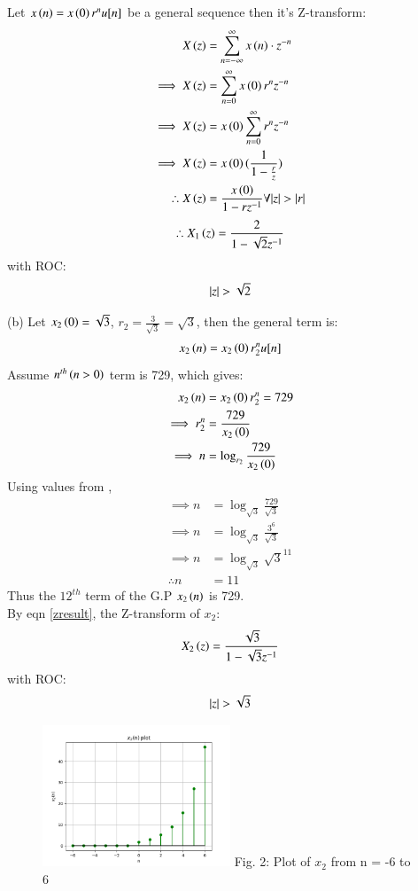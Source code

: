 \documentclass[journal,12pt,twocolumn]{IEEEtran}
\theoremstyle{remark}
\begin{document}
Let $x\left(n\right) = x\left(0\right)r^nu[n]$ be a general sequence then it's Z-transform:
\begin{align}
    X\left(z\right) &= \sum_{n = -\infty}^{\infty}{x\left(n\right) \cdot z^{-n}}\\
    \implies X\left(z\right) &= \sum_{n = 0}^{\infty}{x\left(0\right)r^{n}z^{-n}}\\
    \implies X\left(z\right) &= x\left(0\right)\sum_{n = 0}^{\infty}{r^n z^{-n}}\\
    \implies X\left(z\right) &= x\left(0\right)(\frac{1}{1 - \frac{r}{z}})\\
	\therefore X\left(z\right) &= \frac{x\left(0\right)}{1 - rz^{-1}} \forall {\left\vert z\right\vert > \left\vert r\right\vert} \label{zresult}
\end{align}
\begin{align}
    \therefore X_1\left(z\right) = \frac{2}{1 - \sqrt{2}z^{-1}}
\end{align}
with ROC: \[ \left\vert z\right\vert > \sqrt{2} \]

(b) Let $x_2\left(0\right) = \sqrt{3}$, $r_2 = \frac{3}{\sqrt{3}} = \sqrt{3}$, then the general term is:
\begin{align}
    x_2\left(n\right) = x_2\left(0\right) r_2^nu[n]
\end{align}
Assume $n^{th}\left(n > 0\right)$ term is 729, which gives: 
\begin{align}
    x_2\left(n\right) &= x_2\left(0\right) r_2^n = 729\\
    \implies r_2^n &= \frac{729}{x_2\left(0\right)}\\
    \implies n &= \log_{r_2}{\frac{729}{x_2\left(0\right)}}
\end{align}
Using values from ,
\begin{align}
    \implies n &= \log_{\sqrt{3}}{\frac{729}{\sqrt{3}}}\\
    \implies n &= \log_{\sqrt{3}}{\frac{3^6}{\sqrt{3}}}\\
    \implies n &= \log_{\sqrt{3}}{\sqrt{3}^{11}}\\
    \therefore n &= 11
\end{align}
Thus the $12^{th}$ term of the G.P $x_2\left(n\right)$ is 729. \\

By eqn \ref{zresult}, the Z-transform of $x_2$:
\begin{align} X_2\left(z\right) = \frac{\sqrt{3}}{1 - \sqrt{3}z^{-1}} \end{align}
with ROC: \[ \left\vert z\right\vert > \sqrt{3} \]

\begin{figure}[h!]
    \centering
    \includegraphics[width=0.5\textwidth]{figs/b.png}
    Fig. 2: Plot of $x_2$ from n = -6 to 6
    \label{fig:img2}
\end{figure}
\end{document}
